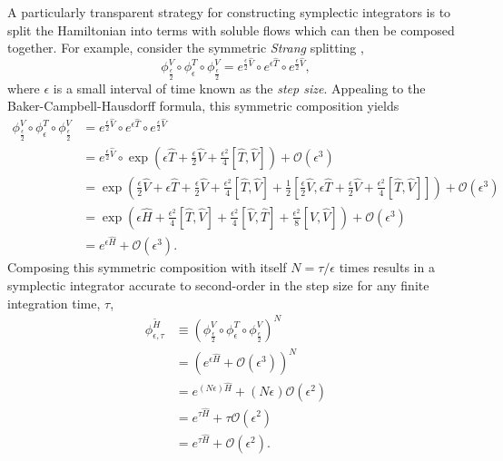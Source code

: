 \documentclass{article}
\begin{document}
A particularly transparent strategy for constructing symplectic integrators is to split 
the Hamiltonian into terms with soluble flows which can then be composed together.  
For example, consider the symmetric \textit{Strang} splitting 
\cite{LeimkuhlerEtAl:2004, HairerEtAl:2006},
%
\begin{equation*}
\phi^{V}_{\frac{\epsilon}{2}} \circ 
\phi^{T}_{\epsilon} \circ 
\phi^{V}_{\frac{\epsilon}{2}}
=
e^{\frac{\epsilon}{2} \hat{V} } \circ 
e^{\epsilon \hat{T} } \circ 
e^{\frac{\epsilon}{2} \hat{V} },
\end{equation*}
%
where $\epsilon$ is a small interval of time known as the \textit{step size}.
Appealing to the Baker-Campbell-Hausdorff formula, this symmetric composition yields
%
\begin{align*}
\phi^{V}_{\frac{\epsilon}{2}} \circ 
\phi^{T}_{\epsilon} \circ 
\phi^{V}_{\frac{\epsilon}{2}}
&=
e^{\frac{\epsilon}{2} \hat{V} } \circ 
e^{\epsilon \hat{T} } \circ 
e^{\frac{\epsilon}{2} \hat{V} }
\\
&=
e^{\frac{\epsilon}{2} \hat{V} } \circ 
\exp \left( \epsilon \hat{T} + \frac{\epsilon}{2} \hat{V} 
+ \frac{\epsilon^{2}}{4} \left[ \hat{T}, \hat{V} \right] \right)
+ \mathcal{O} \! \left( \epsilon^{3} \right)
\\
&=
\exp \left( 
\frac{\epsilon}{2} \hat{V} + \epsilon \hat{T} + \frac{\epsilon}{2} \hat{V} 
+ \frac{\epsilon^{2}}{4} \left[ \hat{T}, \hat{V} \right]
+ \frac{1}{2} \left[ \frac{\epsilon}{2} \hat{V}, \epsilon \hat{T} + \frac{\epsilon}{2} \hat{V} 
+ \frac{\epsilon^{2}}{4} \left[ \hat{T}, \hat{V} \right] \right]
\right)
+ \mathcal{O} \! \left( \epsilon^{3} \right)
\\
&=
\exp \left( 
\epsilon \hat{H} 
+ \frac{\epsilon^{2}}{4} \left[ \hat{T}, \hat{V} \right] +\frac{\epsilon^{2}}{4} \left[ \hat{V}, \hat{T} \right] 
+ \frac{\epsilon^{2}}{8} \left[ \hat{V}, \hat{V} \right]
\right)
+ \mathcal{O} \! \left( \epsilon^{3} \right)
\\
&=
e^{ \epsilon \hat{H} }
+ \mathcal{O} \! \left( \epsilon^{3} \right).
\end{align*}
%
Composing this symmetric composition with itself $N = \tau / \epsilon$ times results in 
a symplectic integrator accurate to second-order in the step size for any finite integration 
time, $\tau$,
%
\begin{align*}
\phi^{\widetilde{H}}_{\epsilon, \tau}
&\equiv
\left( \phi^{V}_{\frac{\epsilon}{2}} \circ 
\phi^{T}_{\epsilon} \circ 
\phi^{V}_{\frac{\epsilon}{2}} \right)^{N}
\\
&=
\left( e^{ \epsilon \hat{H} }
+ \mathcal{O} \! \left( \epsilon^{3} \right) \right)^{N}
\\
&=
e^{ \left( N \epsilon \right) \hat{H} }
+ \left( N \epsilon \right) \mathcal{O} \! \left( \epsilon^{2} \right)
\\
&=
e^{ \tau \hat{H} }
+ \tau \mathcal{O} \! \left( \epsilon^{2} \right)
\\
&=
e^{ \tau \hat{H} }
+ \mathcal{O} \! \left( \epsilon^{2} \right).
\end{align*}
\end{document}
